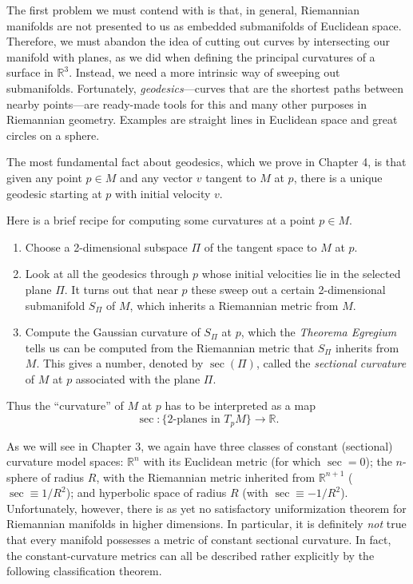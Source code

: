 The first problem we must contend with is that, in general, Riemannian manifolds are not presented to us as embedded submanifolds of Euclidean space. Therefore, we must abandon the idea of cutting out curves by intersecting our manifold with planes, as we did when defining the principal curvatures of a surface in $\mathbb{R}^3$. Instead, we need a more intrinsic way of sweeping out submanifolds. Fortunately, \emph{geodesics}---curves that are the shortest paths between nearby points---are ready-made tools for this and many other purposes in Riemannian geometry. Examples are straight lines in Euclidean space and great circles on a sphere.

The most fundamental fact about geodesics, which we prove in Chapter 4, is that given any point $p\in M$ and any vector $v$ tangent to $M$ at $p$, there is a unique geodesic starting at $p$ with initial velocity $v$.

Here is a brief recipe for computing some curvatures at a point $p\in M$.

\begin{enumerate}
\item Choose a 2-dimensional subspace $\Pi$ of the tangent space to $M$ at $p$.
\item Look at all the geodesics through $p$ whose initial velocities lie in the selected plane $\Pi$. It turns out that near $p$ these sweep out a certain 2-dimensional submanifold $S_\Pi$ of $M$, which inherits a Riemannian metric from $M$.
\item Compute the Gaussian curvature of $S_\Pi$ at $p$, which the \emph{Theorema Egregium} tells us can be computed from the Riemannian metric that $S_\Pi$ inherits from $M$. This gives a number, denoted by $\sec(\Pi)$, called the \emph{sectional curvature} of $M$ at $p$ associated with the plane $\Pi$.
\end{enumerate}

Thus the ``curvature'' of $M$ at $p$ has to be interpreted as a map
\[
\sec: \{2\text{-planes in }T_p M\} \to \mathbb{R}.
\]

As we will see in Chapter 3, we again have three classes of constant (sectional) curvature model spaces: $\mathbb{R}^n$ with its Euclidean metric (for which $\sec = 0$); the $n$-sphere of radius $R$, with the Riemannian metric inherited from $\mathbb{R}^{n+1}$ ($\sec \equiv 1/R^2$); and hyperbolic space of radius $R$ (with $\sec \equiv -1/R^2$). Unfortunately, however, there is as yet no satisfactory uniformization theorem for Riemannian manifolds in higher dimensions. In particular, it is definitely \emph{not} true that every manifold possesses a metric of constant sectional curvature. In fact, the constant-curvature metrics can all be described rather explicitly by the following classification theorem.

